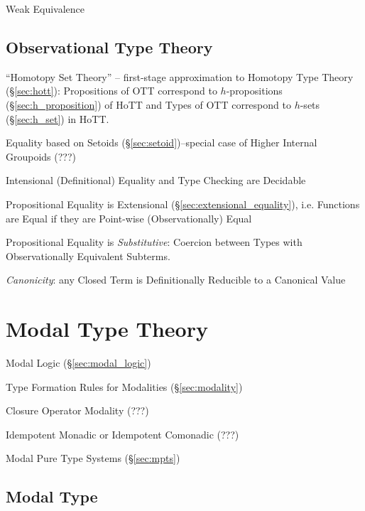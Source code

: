 Weak Equivalence



\subsection{Observational Type Theory}\label{sec:observational_type}

``Homotopy Set Theory'' -- first-stage approximation to Homotopy Type
Theory (\S\ref{sec:hott}): Propositions of OTT correspond to
$h$-propositions (\S\ref{sec:h_proposition}) of HoTT and Types of OTT
correspond to $h$-sets (\S\ref{sec:h_set}) in HoTT.

Equality based on Setoids (\S\ref{sec:setoid})--special case of Higher
Internal Groupoids (???)

Intensional (Definitional) Equality and Type Checking are Decidable

Propositional Equality is Extensional
(\S\ref{sec:extensional_equality}), i.e. Functions are Equal if they
are Point-wise (Observationally) Equal

Propositional Equality is \emph{Substitutive}: Coercion between Types
with Observationally Equivalent Subterms.

\emph{Canonicity}: any Closed Term is Definitionally Reducible to a
Canonical Value



\section{Modal Type Theory}\label{sec:modal_type_theory}

Modal Logic (\S\ref{sec:modal_logic})

Type Formation Rules for Modalities (\S\ref{sec:modality})

Closure Operator Modality (???)

Idempotent Monadic or Idempotent Comonadic (???)

Modal Pure Type Systems (\S\ref{sec:mpts})



\subsection{Modal Type}\label{sec:modal_type}

